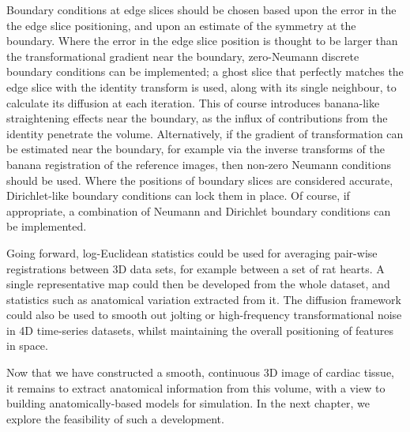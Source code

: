  Boundary conditions at edge slices should be chosen based upon the error in the the edge slice positioning, and upon an estimate of the symmetry at the boundary. Where the error in the edge slice position is thought to be larger than the transformational gradient near the boundary, zero-Neumann discrete boundary conditions can be implemented; a ghost slice that perfectly matches the edge slice with the identity transform is used, along with its single neighbour, to calculate its diffusion at each iteration. This of course introduces banana-like straightening effects near the boundary, as the influx of contributions from the identity penetrate the volume. Alternatively, if the gradient of transformation can be estimated near the boundary, for example via the inverse transforms of the banana registration of the reference images, then non-zero Neumann conditions should be used. Where the positions of boundary slices are considered accurate, Dirichlet-like boundary conditions can lock them in place. Of course, if appropriate, a combination of Neumann and Dirichlet boundary conditions can be implemented.
  
  Going forward, log-Euclidean statistics could be used for averaging pair-wise registrations between 3D data sets, for example between a set of rat hearts. A single representative map could then be developed from the whole dataset, and statistics such as anatomical variation extracted from it. The diffusion framework could also be used to smooth out jolting or high-frequency transformational noise in 4D time-series datasets, whilst maintaining the overall positioning of features in space.
  
  Now that we have constructed a smooth, continuous 3D image of cardiac tissue, it remains to extract anatomical information from this volume, with a view to building anatomically-based models for simulation. In the next chapter, we explore the feasibility of such a development.

